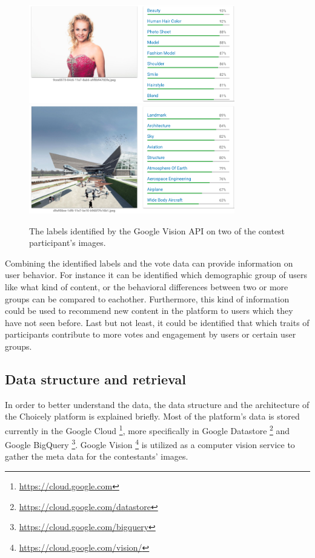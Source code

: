     \begin{figure}[h] 
		\begin{center}
            \includegraphics[width=0.8\textwidth]{images/google_vision_labels.png}
            \includegraphics[width=0.8\textwidth]{images/google_vision_labels2.png}
			\caption{The labels identified by the Google Vision API on two of the contest participant's images.}
			\label{google_vision_labels}
		\end{center}
    \end{figure}

    Combining the identified labels and the vote data can provide information on user behavior. For instance it can be identified which demographic group of users like what kind of content, or the behavioral differences between two or more groups can be compared to eachother. Furthermore, this kind of information could be used to recommend new content in the platform to users which they have not seen before. Last but not least, it could be identified that which traits of participants contribute to more votes and engagement by users or certain user groups.  
    
    \subsection{Data structure and retrieval}
    In order to better understand the data, the data structure and the architecture of the Choicely platform is explained briefly. Most of the platform's data is stored currently in the Google Cloud \footnote{\url{https://cloud.google.com}}, more specifically in Google Datastore \footnote{\url{https://cloud.google.com/datastore}} and Google BigQuery \footnote{\url{https://cloud.google.com/bigquery}}. Google Vision \footnote{\url{https://cloud.google.com/vision/}} is utilized as a computer vision service to gather the meta data for the contestants' images. 
    
